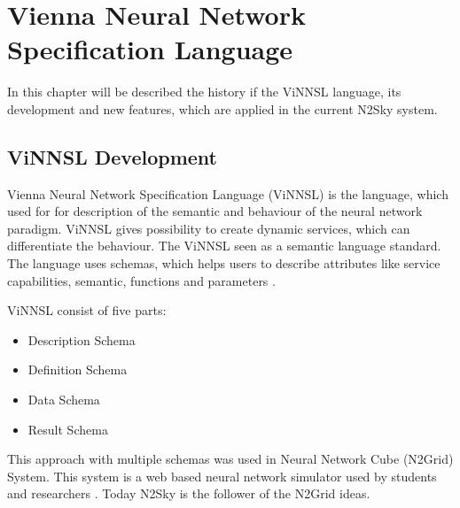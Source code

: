 \section{Vienna Neural Network Specification Language}\label{ViNNSL 2.0 extended}

In this chapter will be described the history if the ViNNSL language, its development and new features, which are applied in the current N2Sky system.

\subsection{ViNNSL Development}\label{ViNNSL Development}
Vienna Neural Network Specification Language (ViNNSL) is the language, which used for for description of the semantic and behaviour of the neural network paradigm. ViNNSL gives possibility to create dynamic services, which can differentiate the behaviour. The ViNNSL seen as a semantic language standard. The language uses schemas, which helps users to describe attributes like service capabilities, semantic, functions and parameters \cite{Beran2008}.

ViNNSL consist of five parts:
\begin{itemize}
\item Description Schema
\item Definition Schema
\item Data Schema
\item Result Schema
\end{itemize}

This approach with multiple schemas was used in Neural Network Cube (N2Grid) System. This system is a web based neural network simulator used by students and researchers \cite{schikuta2004n2grid}. Today N2Sky is the follower of the N2Grid ideas. 

